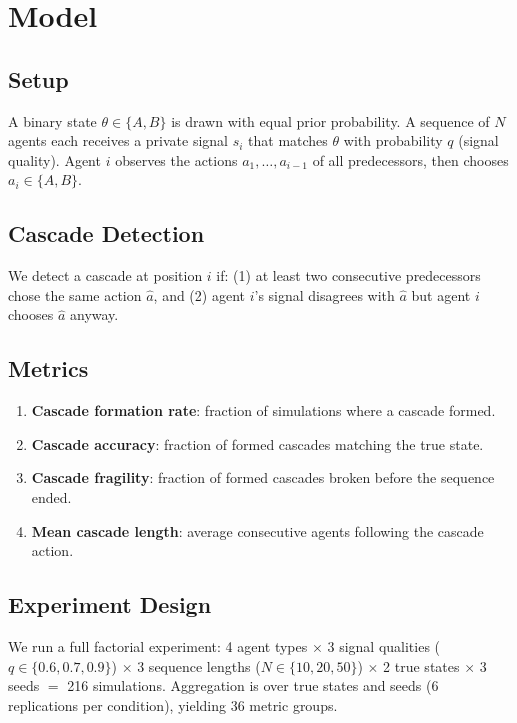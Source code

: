 \documentclass[11pt]{article}
\begin{document}
\section{Model}

\subsection{Setup}

A binary state $\theta \in \{A, B\}$ is drawn with equal prior probability.
A sequence of $N$ agents each receives a private signal $s_i$ that matches $\theta$ with probability $q$ (signal quality).
Agent $i$ observes the actions $a_1, \ldots, a_{i-1}$ of all predecessors, then chooses $a_i \in \{A, B\}$.

\subsection{Cascade Detection}

We detect a cascade at position $i$ if: (1) at least two consecutive predecessors chose the same action $\hat{a}$, and (2) agent $i$'s signal disagrees with $\hat{a}$ but agent $i$ chooses $\hat{a}$ anyway.

\subsection{Metrics}

\begin{enumerate}
  \item \textbf{Cascade formation rate}: fraction of simulations where a cascade formed.
  \item \textbf{Cascade accuracy}: fraction of formed cascades matching the true state.
  \item \textbf{Cascade fragility}: fraction of formed cascades broken before the sequence ended.
  \item \textbf{Mean cascade length}: average consecutive agents following the cascade action.
\end{enumerate}

\subsection{Experiment Design}

We run a full factorial experiment: 4 agent types $\times$ 3 signal qualities ($q \in \{0.6, 0.7, 0.9\}$) $\times$ 3 sequence lengths ($N \in \{10, 20, 50\}$) $\times$ 2 true states $\times$ 3 seeds $=$ 216 simulations.
Aggregation is over true states and seeds (6 replications per condition), yielding 36 metric groups.
\end{document}
